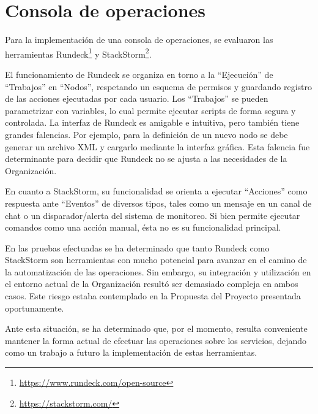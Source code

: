 %
%
\section{Consola de operaciones}
%
Para la implementación de una consola de operaciones, se evaluaron las
herramientas Rundeck\footnote{
  \url{https://www.rundeck.com/open-source} } y StackStorm\footnote{
  \url{https://stackstorm.com/} }.

El funcionamiento de Rundeck se organiza en torno a la ``Ejecución'' de
``Trabajos'' en ``Nodos'', respetando un esquema de permisos y guardando
registro de las acciones ejecutadas por cada usuario. Los ``Trabajos''
se pueden parametrizar con variables, lo cual permite ejecutar scripts
de forma segura y controlada. La interfaz de Rundeck es amigable e
intuitiva, pero también tiene grandes falencias. Por ejemplo, para la
definición de un nuevo nodo se debe generar un archivo XML y cargarlo
mediante la interfaz gráfica. Esta falencia fue determinante para
decidir que Rundeck no se ajusta a las necesidades de la Organización.

En cuanto a StackStorm, su funcionalidad se orienta a ejecutar
``Acciones'' como respuesta ante ``Eventos'' de diversos tipos, tales como
un mensaje en un canal de chat o un disparador/alerta del sistema de
monitoreo. Si bien permite ejecutar comandos como una acción manual,
ésta no es su funcionalidad principal.

En las pruebas efectuadas se ha determinado que tanto Rundeck como
StackStorm son herramientas con mucho potencial para avanzar en el
camino de la automatización de las operaciones. Sin embargo, su
integración y utilización en el entorno actual de la Organización
resultó ser demasiado compleja en ambos casos. Este riesgo estaba
contemplado en la Propuesta del Proyecto presentada oportunamente.

Ante esta situación, se ha determinado que, por el momento, resulta
conveniente mantener la forma actual de efectuar las operaciones sobre
los servicios, dejando como un trabajo a futuro la implementación de
estas herramientas.
